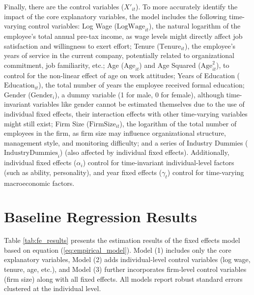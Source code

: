 Finally, there are the control variables (\(X'_{it}\)). To more accurately identify the impact of the core explanatory variables, the model includes the following time-varying control variables: {Log Wage (\(\text{LogWage}_{it}\))}, the natural logarithm of the employee's total annual pre-tax income, as wage levels might directly affect job satisfaction and willingness to exert effort; {Tenure (\(\text{Tenure}_{it}\))}, the employee's years of service in the current company, potentially related to organizational commitment, job familiarity, etc.; {Age (\(\text{Age}_{it}\))} and {Age Squared (\(\text{Age}^2_{it}\))}, to control for the non-linear effect of age on work attitudes; {Years of Education (\(\text{Education}_{it}\))}, the total number of years the employee received formal education; {Gender (\(\text{Gender}_{i}\))}, a dummy variable (1 for male, 0 for female), although time-invariant variables like gender cannot be estimated themselves due to the use of individual fixed effects, their interaction effects with other time-varying variables might still exist; {Firm Size (\(\text{FirmSize}_{it}\))}, the logarithm of the total number of employees in the firm, as firm size may influence organizational structure, management style, and monitoring difficulty; and a series of {Industry Dummies (\(\text{IndustryDummies}_{i}\))} (also affected by individual fixed effects). Additionally, individual fixed effects (\(\alpha_i\)) control for time-invariant individual-level factors (such as ability, personality), and year fixed effects (\(\gamma_t\)) control for time-varying macroeconomic factors.

\section{Baseline Regression Results}\label{sec:empirical_baseline_results}

Table \ref{tab:fe_results} presents the estimation results of the fixed effects model based on equation (\ref{eq:empirical_model}). Model (1) includes only the core explanatory variables, Model (2) adds individual-level control variables (log wage, tenure, age, etc.), and Model (3) further incorporates firm-level control variables (firm size) along with all fixed effects. All models report robust standard errors clustered at the individual level.

